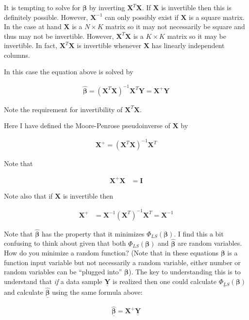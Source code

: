 \documentclass[12pt]{article}
\newcommand{\bv}[1]{\boldsymbol{#1}}
\newcommand{\ul}[1]{\underline{#1}}
\begin{document}
It is tempting to solve for $\bv{\beta}$ by inverting $\bv{X}^T\bv{X}$. 
If $\bv{X}$ is invertible then this is definitely possible. 
However, $\bv{X}^{-1}$ can only possibly exist if $\bv{X}$ is a square matrix. 
In the case at hand $\bv{X}$ is a $N\times K$ matrix so it may not necessarily be square and thus may not be invertible. 
However, $\bv{X}^T\bv{X}$ is a $K\times K$ matrix so it may be invertible. 
In fact, $\bv{X}^T\bv{X}$ is invertible whenever $\bv{X}$ has linearly independent columns.

In this case the equation above is solved by

\begin{align}
\boxed{
\bv{\hat{\beta}} = \left(\bv{X}^T\bv{X}\right)^{-1}\bv{X}^T\bv{Y} = \bv{X}^+ \bv{Y}
}
\end{align}

Note the requirement for invertibility of $\bv{X}^T\bv{X}$.

Here I have defined the Moore-Penrose pseudoinverse of $\bv{X}$ by

\begin{align}
\bv{X}^+ = (\bv{X}^T\bv{X})^{-1}\bv{X}^T
\end{align}

Note that

\begin{align}
\bv{X}^+ \bv{X} &= \bv{I}
\end{align}

Note also that if $\bv{X}$ is invertible then

\begin{align}
\bv{X}^+ &= \bv{X}^{-1}(\bv{X}^T)^{-1} \bv{X}^T = \bv{X}^{-1}
\end{align}

Note that $\bv{\hat{\beta}}$ has the property that it minimizes $\Phi_{LS}(\bv{\beta})$. 
I find this a bit confusing to think about given that both $\Phi_{LS}(\bv{\beta})$ and $\bv{\hat{\beta}}$ are random variables. 
How do you minimize a random function? (Note that in these equations $\bv{\beta}$ is a function input variable but not necessarily a random variable, either number or random variables can be ``plugged into'' $\bv{\beta}$). 
The key to understanding this is to understand that \textit{if} a data sample $\ul{\bv{Y}}$ is realized then one could calculate $\ul{\Phi_{LS}}(\bv{\beta})$ and calculate $\ul{\bv{\hat{\beta}}}$ using the same formula above:

\begin{align}
\ul{\bv{\hat{\beta}}} = \bv{X}^+ \ul{\bv{Y}}
\end{align}
\end{document}
